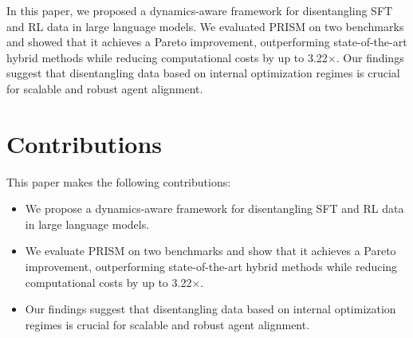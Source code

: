 \documentclass{article}
\begin{document}
In this paper, we proposed a dynamics-aware framework for disentangling SFT and RL data in large language models. We evaluated PRISM on two benchmarks and showed that it achieves a Pareto improvement, outperforming state-of-the-art hybrid methods while reducing computational costs by up to 3.22$\times$. Our findings suggest that disentangling data based on internal optimization regimes is crucial for scalable and robust agent alignment.

\section{Contributions}

This paper makes the following contributions:

\begin{itemize}
\item We propose a dynamics-aware framework for disentangling SFT and RL data in large language models.
\item We evaluate PRISM on two benchmarks and show that it achieves a Pareto improvement, outperforming state-of-the-art hybrid methods while reducing computational costs by up to 3.22$\times$.
\item Our findings suggest that disentangling data based on internal optimization regimes is crucial for scalable and robust agent alignment.
\end{itemize}
\end{document}
